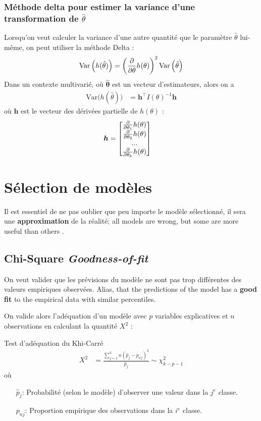 \documentclass[10pt, french]{article}
\begin{document}
\begin{multicols*}{3}
\subsubsection*{Méthode delta pour estimer la variance d'une transformation de $\hat{\theta}$}
Lorsqu'on veut calculer la variance d'une autre quantité que le paramètre $\hat{\theta}$ lui-même, on peut utiliser la méthode Delta : 
\[
	\mathrm{Var} \left( h(\hat{\theta}) \right)
	= 	\left( \frac{\partial}{\partial \theta} h(\theta) \right)^2 \mathrm{Var} \left( \hat{\theta} \right)
\]
Dans un contexte multivarié, où $\bm{\hat{\theta}}$ est un vecteur d'estimateurs, alors on a
\begin{align*}
	\text{Var}\big(h(\hat{\theta})\big)	
	&= 	\bm{h}^{\top} I(\theta)^{-1} \bm{h}
\end{align*}
où $\bm{h}$ est le vecteur des dérivées partielle de $h(\theta)$ : 
\begin{align*}
	\bm{h}	
	&=	\begin{bmatrix}
			\frac{\partial}{\partial \theta_1} h(\theta) \\
			\frac{\partial}{\partial \theta_2} h(\theta) \\
			... \\
			\frac{\partial}{\partial \theta_k} h(\theta) \\
		\end{bmatrix}
\end{align*}


\setcounter{section}{14}
\columnbreak
\section{Sélection de modèles}

Il est essentiel de ne pas oublier que peu importe le modèle sélectionné, il sera une \textbf{approximation} de la réalité; \guillemotleft all models are wrong, but some are more useful than others \guillemotright.

\subsection*{Chi-Square \emph{Goodness-of-fit}}

On veut valider que les prévisions du modèle ne sont pas trop différentes des valeurs empiriques observées. 
Alias, that the predictions of the model has a \textbf{good fit} to the empirical data with similar percentiles.

On valide alors l'adéquation d'un modèle avec $p$ variables explicatives et $n$ observations en calculant la quantité $X^2$ : 
\begin{algo}{Test d'adéquation du Khi-Carré}
\begin{align*}
	X^2 
	&= 	\frac{\sum_{j = 1}^{k} n(\hat{p}_j - p_{nj})^2 }{\hat{p}_j} 
	\sim	\chi^{2}_{k - p - 1}
\end{align*}
où 
\begin{enumerate}
	\item[$\hat{p}_j$:]	Probabilité (selon le modèle) d'observer une valeur dans la $j^{e}$ classe.
	\item[$p_{nj}$:]	Proportion empirique des observations dans la $i^{e}$ classe.
\end{enumerate}
\end{algo}



\end{multicols*}
\end{document}
